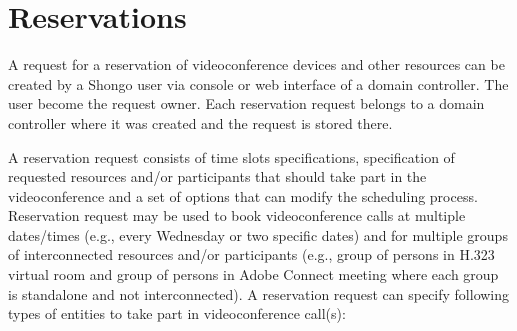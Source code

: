 \chapter{Reservations}

A request for a reservation of videoconference devices and other resources can be created by a Shongo user via console or web interface of a domain controller. The user become the request owner. Each reservation request belongs to a domain controller where it was created and the request is stored there. 

A reservation request consists of time slots specifications, specification of requested resources and/or participants that should take part in the videoconference and a set of options that can modify the scheduling process. Reservation request may be used to book videoconference calls at multiple dates/times (e.g., every Wednesday or two specific dates) and for multiple groups of interconnected resources and/or participants (e.g., group of persons in H.323 virtual room and group of persons in Adobe Connect meeting where each group is standalone and not interconnected). A reservation request can specify following types of entities to take part in videoconference call(s):
